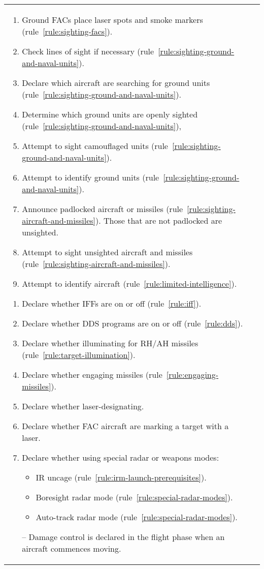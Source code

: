 \begin{twocolumntable}
\begin{tabularx}{1.0\linewidth}{L@{\hspace{\columnsep}}L}
{\begin{enumerate}
\begin{enumerate}[nosep]
    \item Ground FACs place laser spots and smoke markers (rule~\ref{rule:sighting-facs}).
    \item Check lines of sight if necessary (rule~\ref{rule:sighting-ground-and-naval-units}).
    \item Declare which aircraft are searching for ground units (rule~\ref{rule:sighting-ground-and-naval-units}).
    \item Determine which ground units are openly sighted (rule~\ref{rule:sighting-ground-and-naval-units}),
    \item Attempt to sight camouflaged units (rule~\ref{rule:sighting-ground-and-naval-units}).
    \item Attempt to identify ground units (rule~\ref{rule:sighting-ground-and-naval-units}).
    \item Announce padlocked aircraft or missiles (rule~\ref{rule:sighting-aircraft-and-missiles}). Those that are not padlocked are unsighted.
    \item Attempt to sight unsighted aircraft and missiles (rule~\ref{rule:sighting-aircraft-and-missiles}).
    \item Attempt to identify aircraft (rule~\ref{rule:limited-intelligence}).
\end{enumerate}


\begin{enumerate}[nosep]
    \item Declare whether IFFs are on or off (rule~\ref{rule:iff}).
    \item Declare whether DDS programs are on or off (rule~\ref{rule:dds}).
    \item Declare whether illuminating for RH/AH missiles (rule~\ref{rule:target-illumination}).
    \item Declare whether engaging missiles (rule~\ref{rule:engaging-missiles}).
    \item Declare whether laser-designating.
    \item Declare whether FAC aircraft are marking a target with a laser.
    \item Declare whether using special radar or weapons modes:
    \begin{itemize}
        \item IR uncage (rule~\ref{rule:irm-launch-prerequisites}).
        \item Boresight radar mode (rule~\ref{rule:special-radar-modes}).
        \item Auto-track radar mode (rule~\ref{rule:special-radar-modes}).
    \end{itemize}
    \item[--] Damage control is declared in the flight phase when an aircraft commences moving.
\end{enumerate}


\end{enumerate}}
\end{tabularx}
\end{twocolumntable}
